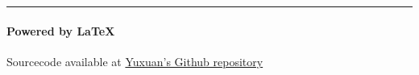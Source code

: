 




    

    \noindent\rule{\textwidth}{0.1pt}
    \vspace{-30pt}
    \paragraph*{Powered by \LaTeX}
    \noindent Sourcecode available at \href{<github.com/zhangyx1998/Courses_FALL2019>}{Yuxuan's Github repository}



